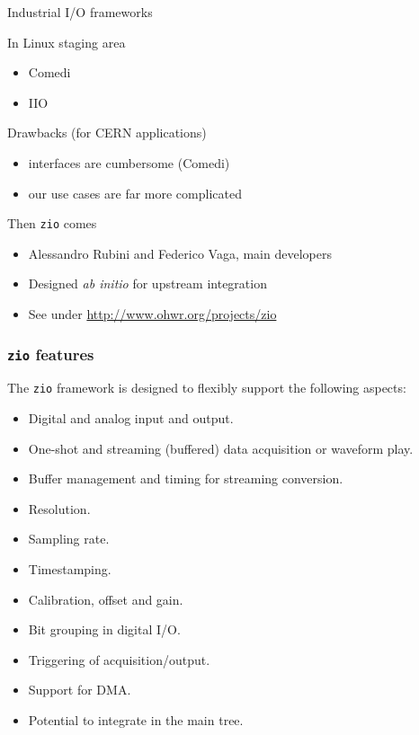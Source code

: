 \documentclass[compress,red]{beamer}
\begin{document}
\begin{frame}{Industrial I/O frameworks}

\pause
\begin{block}{In Linux staging area}
\begin{itemize}
\item Comedi
\item IIO
\end{itemize}
\end{block}

\pause
\begin{block}{Drawbacks (for CERN applications)}
\begin{itemize}
\item interfaces are cumbersome (Comedi)
\item our use cases are far more complicated
\end{itemize}
\end{block}

\pause
\begin{block}{Then \texttt{zio} comes}
\begin{itemize}
\item Alessandro Rubini and Federico Vaga, main developers
\item Designed \emph{ab initio} for upstream integration
\item See under \url{http://www.ohwr.org/projects/zio}
\end{itemize}
\end{block}

\end{frame}

\begin{frame}
\frametitle{\texttt{zio} features}

The \texttt{zio} framework is designed to flexibly support the following
aspects:
\begin{itemize}
\item Digital and analog input and output.
\item One-shot and streaming (buffered) data acquisition or waveform play.
\item Buffer management and timing for streaming conversion.
\item Resolution.
\item Sampling rate.
\item Timestamping.
\item Calibration, offset and gain.
\item Bit grouping in digital I/O.
\item Triggering of acquisition/output.
\item Support for DMA.
\item Potential to integrate in the main tree.
\end{itemize}

\end{frame}
\end{document}
